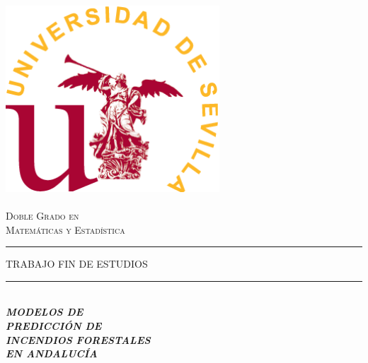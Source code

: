 \begin{titlepage}

\newcommand{\HRule}{\rule{\linewidth}{0.5mm}} %

\center %


\begin{minipage}{14cm}
\center

\includegraphics[width=8cm,height=8cm]{logo}\\[0.5cm] %


\textsc{\LARGE Doble Grado en \\[0.2cm]
	Matemáticas y Estadística}\\[2.3cm] 



\rule[1.7mm]{2cm}{0.5mm}
\hfill
\textsc{\Large TRABAJO FIN DE ESTUDIOS} 
\hfill
\rule[1.7mm]{2cm}{0.5mm} 
\\[0.75cm]

{\Huge
\textbf{\textit{
MODELOS DE \\[0.2cm]
PREDICCIÓN DE \\[0.2cm]
INCENDIOS FORESTALES \\[0.2cm] %
EN ANDALUCÍA\textbf{}
}}}\\[0.75cm] 


\end{minipage}
\end{titlepage}
